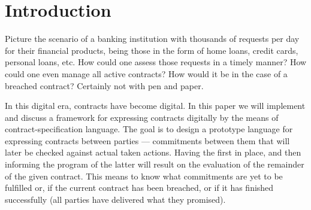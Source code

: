 \documentclass{ituthesis}
\begin{document}

\hyphenchar{}

\frontmatter

\thetitlepage
\newpage

\cleardoublepage
\setcounter{tocdepth}{1}
\tableofcontents

\mainmatter

\midsloppy
\sloppybottom

\chapter{Introduction}

Picture the scenario of a banking institution with thousands of requests per day for their financial products, being those in the form of home loans, credit cards, personal loans, etc. How could one assess those requests in a timely manner? How could one even manage all active contracts? How would it be in the case of a breached contract? Certainly not with pen and paper.

In this digital era, contracts have become digital. In this paper we will implement and discuss a framework for expressing contracts digitally by the means of contract-specification language. The goal is to design a prototype language for expressing contracts between parties --- commitments between them that will later be checked against actual taken actions. Having the first in place, and then informing the program of the latter will result on the evaluation of the remainder of the given contract. This means to know what commitments are yet to be fulfilled or, if the current contract has been breached, or if it has finished successfully (all parties have delivered what they promised).
\end{document}

